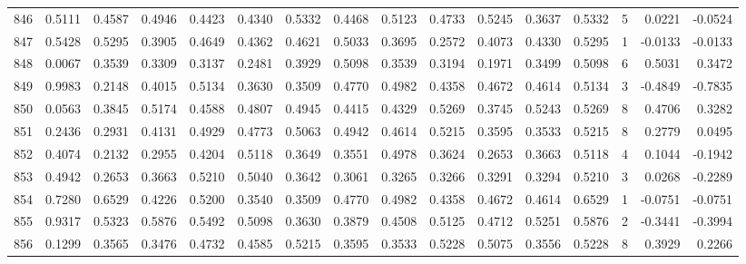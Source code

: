\begin{tabular}{lrrrrrrrrrrrrrrr}
846 &      0.5111 &  0.4587 &  0.4946 &  0.4423 &  0.4340 &  0.5332 &  0.4468 &  0.5123 &  0.4733 &  0.5245 &   0.3637 &     0.5332 &      5 &                    0.0221 &                    -0.0524 \\
847 &      0.5428 &  0.5295 &  0.3905 &  0.4649 &  0.4362 &  0.4621 &  0.5033 &  0.3695 &  0.2572 &  0.4073 &   0.4330 &     0.5295 &      1 &                   -0.0133 &                    -0.0133 \\
848 &      0.0067 &  0.3539 &  0.3309 &  0.3137 &  0.2481 &  0.3929 &  0.5098 &  0.3539 &  0.3194 &  0.1971 &   0.3499 &     0.5098 &      6 &                    0.5031 &                     0.3472 \\
849 &      0.9983 &  0.2148 &  0.4015 &  0.5134 &  0.3630 &  0.3509 &  0.4770 &  0.4982 &  0.4358 &  0.4672 &   0.4614 &     0.5134 &      3 &                   -0.4849 &                    -0.7835 \\
850 &      0.0563 &  0.3845 &  0.5174 &  0.4588 &  0.4807 &  0.4945 &  0.4415 &  0.4329 &  0.5269 &  0.3745 &   0.5243 &     0.5269 &      8 &                    0.4706 &                     0.3282 \\
851 &      0.2436 &  0.2931 &  0.4131 &  0.4929 &  0.4773 &  0.5063 &  0.4942 &  0.4614 &  0.5215 &  0.3595 &   0.3533 &     0.5215 &      8 &                    0.2779 &                     0.0495 \\
852 &      0.4074 &  0.2132 &  0.2955 &  0.4204 &  0.5118 &  0.3649 &  0.3551 &  0.4978 &  0.3624 &  0.2653 &   0.3663 &     0.5118 &      4 &                    0.1044 &                    -0.1942 \\
853 &      0.4942 &  0.2653 &  0.3663 &  0.5210 &  0.5040 &  0.3642 &  0.3061 &  0.3265 &  0.3266 &  0.3291 &   0.3294 &     0.5210 &      3 &                    0.0268 &                    -0.2289 \\
854 &      0.7280 &  0.6529 &  0.4226 &  0.5200 &  0.3540 &  0.3509 &  0.4770 &  0.4982 &  0.4358 &  0.4672 &   0.4614 &     0.6529 &      1 &                   -0.0751 &                    -0.0751 \\
855 &      0.9317 &  0.5323 &  0.5876 &  0.5492 &  0.5098 &  0.3630 &  0.3879 &  0.4508 &  0.5125 &  0.4712 &   0.5251 &     0.5876 &      2 &                   -0.3441 &                    -0.3994 \\
856 &      0.1299 &  0.3565 &  0.3476 &  0.4732 &  0.4585 &  0.5215 &  0.3595 &  0.3533 &  0.5228 &  0.5075 &   0.3556 &     0.5228 &      8 &                    0.3929 &                     0.2266 \\

\end{tabular}
